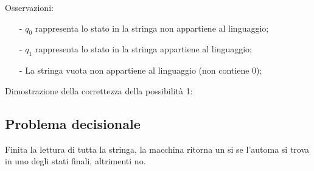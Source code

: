 \documentclass[a4paper, 10pt]{report}
\begin{document}
\noindent Osservazioni: 
\begin{itemize}
\item[-] $q_0$ rappresenta lo stato in la stringa non appartiene al linguaggio;
\item[-] $q_1$ rappresenta lo stato in la stringa appartiene al linguaggio;
\item[-] La stringa vuota non appartiene al linguaggio (non contiene 0);
\end{itemize}

\noindent Dimostrazione della correttezza della possibilità 1:

\subsection*{Problema decisionale}
Finita la lettura di tutta la stringa, la macchina ritorna un si se l'automa si trova in uno degli stati finali, altrimenti no.
\end{document}
